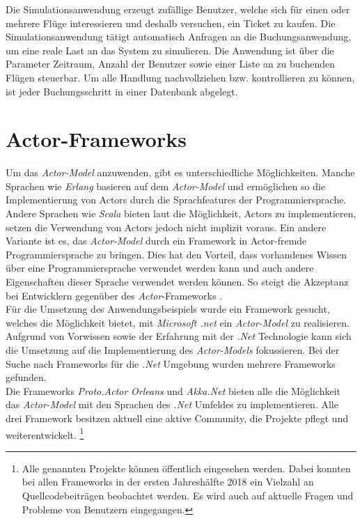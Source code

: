 Die Simulationsanwendung erzeugt zufällige Benutzer, welche sich für einen oder mehrere Flüge interessieren und deshalb versuchen, ein Ticket zu kaufen. Die Simulationsanwendung tätigt automatisch Anfragen an die Buchungsanwendung, um eine reale Last an das System zu simulieren. Die Anwendung ist über die Parameter Zeitraum, Anzahl der Benutzer sowie einer Liste an zu buchenden Flügen steuerbar. 
Um alle Handlung nachvollziehen bzw. kontrollieren zu können, ist jeder Buchungsschritt in einer Datenbank abgelegt.


\section{Actor-Frameworks}\label{sec:ActorFrameworks}
Um das \textit{Actor-Model} anzuwenden, gibt es unterschiedliche Möglichkeiten. Manche Sprachen wie \textit{Erlang} basieren auf dem \textit{Actor-Model} und ermöglichen so die Implementierung von Actors \citep{actorComparativeAnalysis} durch die Sprachfeatures der Programmiersprache. Andere Sprachen wie \textit{Scala} bieten laut \cite{haller2012actors} die Möglichkeit, Actors zu implementieren, setzen die Verwendung von Actors jedoch nicht implizit voraus. Ein andere Variante ist es, das \textit{Actor-Model} durch ein Framework in Actor-fremde Programmiersprache zu bringen. Dies hat den Vorteil, dass vorhandenes Wissen über eine Programmiersprache verwendet werden kann und auch andere Eigenschaften dieser Sprache verwendet werden können. So steigt die Akzeptanz bei Entwicklern gegenüber des \textit{Actor}-Frameworks \citep{lee2006problem}. \\
Für die Umsetzung des Anwendungsbeispiels wurde ein Framework gesucht, welches die Möglichkeit bietet, mit \textit{Microsoft .net} ein \textit{Actor-Model} zu realisieren. Aufgrund von Vorwissen sowie der Erfahrung mit der \textit{.Net} Technologie kann sich die Umsetzung auf die Implementierung des \textit{Actor-Models} fokussieren. Bei der Suche nach Frameworks für die \textit{.Net} Umgebung wurden mehrere Frameworks gefunden. \\
Die Frameworks \textit{Proto.Actor} \textit{Orleans} und \textit{Akka.Net} bieten alle die Möglichkeit das \textit{Actor-Model} mit den Sprachen des \textit{.Net} Umfeldes zu implementieren. Alle drei Framework besitzen aktuell eine aktive Community, die Projekte pflegt und weiterentwickelt.
\footnote{Alle genannten Projekte können öffentlich eingesehen werden. Dabei konnten bei allen Frameworks in der ersten Jahreshälfte 2018 ein Vielzahl an Quellcodebeiträgen beobachtet werden. Es wird auch auf aktuelle Fragen und Probleme von Benutzern eingegangen.}

